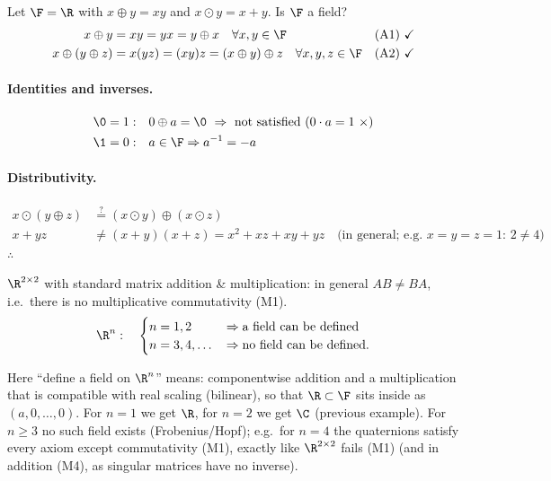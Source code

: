\begin{example}
Let $\F=\R$ with $x\oplus y = xy$ and $x\odot y = x+y$. Is $\F$ a field?
\begin{align*}
x\oplus y &= xy = yx = y\oplus x \quad \forall x,y\in\F && \text{(A1)}\ \checkmark\\
x\oplus(y\oplus z) &= x(yz) = (xy)z = (x\oplus y)\oplus z \quad \forall x,y,z\in\F && \text{(A2)}\ \checkmark
\end{align*}
\paragraph{Identities and inverses.}
\begin{align*}
\0 &= 1: && 0\oplus a = \0 \ \Rightarrow\ \text{not satisfied } (0\cdot a = 1 \ \times)\\
\1 &= 0: && a\in\F \Rightarrow a^{-1} = -a
\end{align*}
\paragraph{Distributivity.}
\begin{align*}
x\odot(y\oplus z) &\overset{?}{=} (x\odot y)\oplus(x\odot z)\\
x+yz &\neq (x+y)(x+z) = x^2+xz+xy+yz \quad\text{(in general; e.g.\ $x=y=z=1$: $2\neq4$)}
\end{align*}
$\therefore$ 
\end{example}

\begin{example}
$\R^{2\times2}$ with standard matrix addition \& multiplication: in general $AB\neq BA$, i.e.\ there is no multiplicative commutativity (M1).
\[
\R^n:\quad
\begin{cases}
n=1,2 & \Rightarrow \text{a field can be defined}\\
n=3,4,\dots & \Rightarrow \text{no field can be defined.}
\end{cases}
\]
\begin{insight}
Here ``define a field on $\R^n$'' means: componentwise addition and a multiplication that is compatible with real scaling (bilinear), so that $\R\subset\F$ sits inside as $(a,0,\dots,0)$. For $n=1$ we get $\R$, for $n=2$ we get $\C$ (previous example). For $n\ge3$ no such field exists (Frobenius/Hopf); e.g.\ for $n=4$ the quaternions satisfy every axiom except commutativity (M1), exactly like $\R^{2\times2}$ fails (M1) (and in addition (M4), as singular matrices have no inverse).
\end{insight}
\end{example}

